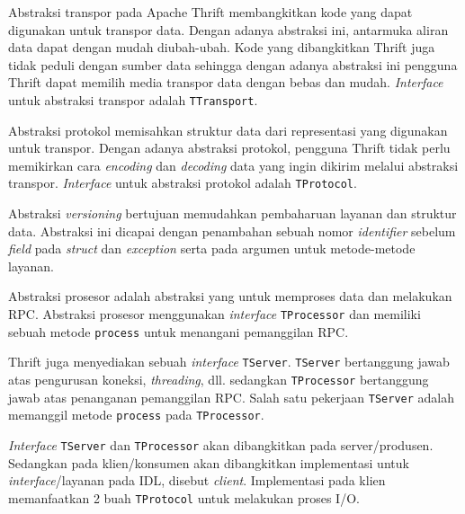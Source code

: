 Abstraksi transpor pada Apache Thrift membangkitkan kode yang dapat
di\-gu\-na\-kan untuk transpor data. Dengan adanya abstraksi ini, antarmuka
aliran data dapat dengan mudah diubah-ubah. Kode yang dibangkitkan Thrift juga
tidak peduli dengan sumber data sehingga dengan adanya abstraksi ini pengguna
Thrift dapat memilih media transpor data dengan bebas dan mudah.
\textit{Interface} untuk abstraksi transpor adalah \texttt{TTransport}.

Abstraksi protokol memisahkan struktur data dari representasi yang digunakan
untuk transpor. Dengan adanya abstraksi protokol, pengguna Thrift tidak perlu
memikirkan cara \textit{encoding} dan \textit{decoding} data yang ingin dikirim
melalui abstraksi transpor. \textit{Interface} untuk abstraksi protokol adalah
\texttt{TProtocol}.

Abstraksi \textit{versioning} bertujuan memudahkan pembaharuan layanan dan
struktur data. Abstraksi ini dicapai dengan penambahan sebuah nomor
\textit{identifier} sebelum \textit{field} pada \textit{struct} dan
\textit{exception} serta pada argumen untuk metode-metode layanan.

Abstraksi prosesor adalah abstraksi yang untuk memproses data dan melakukan RPC.
Abstraksi prosesor menggunakan \textit{interface} \texttt{TProcessor} dan
memiliki sebuah metode \texttt{process} untuk menangani pemanggilan RPC.

Thrift juga menyediakan sebuah \textit{interface} \texttt{TServer}.
\texttt{TServer} bertanggung jawab atas pengurusan koneksi, \textit{threading},
dll. sedangkan \texttt{TProcessor} bertanggung jawab atas penanganan pemanggilan
RPC. Salah satu pekerjaan \texttt{TServer} adalah memanggil metode
\texttt{process} pada \texttt{TProcessor}.

\textit{Interface} \texttt{TServer} dan \texttt{TProcessor} akan dibangkitkan
pada server/produsen. Se\-dang\-kan pada klien/konsumen akan dibangkitkan
implementasi untuk \textit{interface}/la\-ya\-nan pada IDL, disebut
\textit{client}. Implementasi pada klien memanfaatkan 2 buah \texttt{TProtocol}
untuk melakukan proses I/O.

